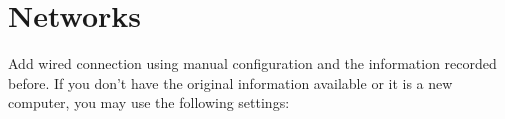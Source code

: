 \documentclass[12pt]{article}
\begin{document}
\section{Networks}
Add wired connection using manual configuration and the information recorded before.
If you don't have the original information available or it is a new computer, you may use the following settings:
\end{document}
